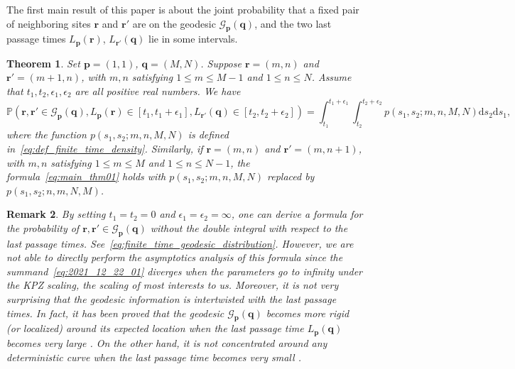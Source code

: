 \documentclass{article}
\newtheorem{thm}{Theorem}[section]
\newtheorem{rmk}[thm]{Remark}
\numberwithin{equation}{section}
\newcommand{\gd}{{\mathcal{G}}}
\newcommand{\prob}{\mathbb{P}}
\begin{document}
The first main result of this paper is about the joint probability that a fixed pair of neighboring sites $\mathbf{r}$ and $\mathbf{r}'$ are on the geodesic $\gd_{\mathbf{p}}(\mathbf{q})$, and the two last passage times $L_{\mathbf{p}}(\mathbf{r})$, $L_{\mathbf{r}'}(\mathbf{q})$ lie in some intervals.
\begin{thm}
	\label{thm:finite_time_geodesic1}
	Set $\mathbf{p}=(1,1)$, $\mathbf{q}=(M,N)$. Suppose $\mathbf{r}=(m,n)$ and $\mathbf{r'}=(m+1,n)$, with $m,n$ satisfying $1\le m\le M-1$ and $1\le n\le N$. Assume that $t_1,t_2,\epsilon_1,\epsilon_2$ are all positive real numbers. We have
	\begin{equation}
		\label{eq:main_thm01}
		\prob
		    \left(
		       \mathbf{r},\mathbf{r}'\in\gd_{\mathbf{p}}(\mathbf{q}),
		       L_{\mathbf{p}}(\mathbf{r})\in[t_1,t_1+\epsilon_1], L_{\mathbf{r'}}(\mathbf{q})\in[t_2,t_2+\epsilon_2]
		     \right)
		=
		    \int_{t_1}^{t_1+\epsilon_1}
		    \int_{t_2}^{t_2+\epsilon_2}
		      p(s_1,s_2;m,n,M,N)
		    \mathrm{d}s_2\mathrm{d}s_1,
	\end{equation}
where the function $p(s_1,s_2;m,n,M,N)$ is defined in~\eqref{eq:def_finite_time_density}. Similarly, if $\mathbf{r}=(m,n)$ and $\mathbf{r'}=(m,n+1)$, with $m,n$ satisfying $1\le m\le M$ and $1\le n\le N-1$, the formula~\eqref{eq:main_thm01} holds with $p(s_1,s_2;m,n,M,N)$ replaced by $p(s_1,s_2;n,m,N,M)$.
\end{thm}
\begin{rmk}
	\label{rmk:geodesic_probability}
	By setting $t_1=t_2=0$ and $\epsilon_1=\epsilon_2=\infty$, one can derive a  formula for the probability of $\mathbf{r},\mathbf{r}'\in\gd_{\mathbf{p}}(\mathbf{q})$ without the double integral with respect to the last passage times. See~\eqref{eq:finite_time_geodesic_distribution}. However, we are not able to directly perform the asymptotics analysis of this formula since the summand~\eqref{eq:2021_12_22_01} diverges when the parameters go to infinity under the KPZ scaling, the scaling of most interests to us. Moreover, it is not very surprising that the geodesic information is intertwisted with the last passage times. In fact, it has been proved that the geodesic $\gd_{\mathbf{p}}(\mathbf{q})$ becomes more rigid (or localized) around its expected location when the last passage time $L_{\mathbf{p}}(\mathbf{q})$ becomes very large \cite{Basu-Ganguly19,Liu21}. On the other hand, it is not concentrated around any deterministic curve when the last passage time becomes very small \cite{Basu-Ganguly-Sly19}.
\end{rmk}
\end{document}
